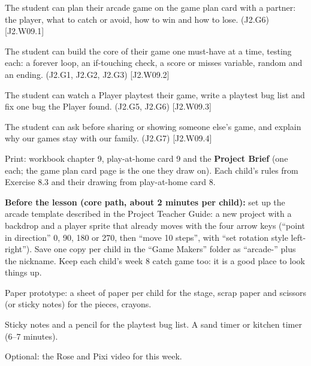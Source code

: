 
\begin{objectives}
  \item The student can plan their arcade game on the game plan card with a partner: the player, what to catch or avoid, how to win and how to lose. (J2.G6) [J2.W09.1]
  \item The student can build the core of their game one must-have at a time, testing each: a forever loop, an if-touching check, a score or misses variable, random and an ending. (J2.G1, J2.G2, J2.G3) [J2.W09.2]
  \item The student can watch a Player playtest their game, write a playtest bug list and fix one bug the Player found. (J2.G5, J2.G6) [J2.W09.3]
  \item The student can ask before sharing or showing someone else's game, and explain why our games stay with our family. (J2.G7) [J2.W09.4]
\end{objectives}

\begin{materials}
  \item Print: workbook chapter 9, play-at-home card 9 and the \textbf{Project Brief} (one each; the game plan card page is the one they draw on). Each child's rules from Exercise 8.3 and their drawing from play-at-home card 8.
  \item \textbf{Before the lesson (core path, about 2 minutes per child):} set up the arcade template described in the Project Teacher Guide: a new project with a backdrop and a player sprite that already moves with the four arrow keys (\enquote{point in direction} 0, 90, 180 or 270, then \enquote{move 10 steps}, with \enquote{set rotation style left-right}). Save one copy per child in the \enquote{Game Makers} folder as \enquote{arcade-} plus the nickname. Keep each child's week 8 catch game too: it is a good place to look things up.
  \item Paper prototype: a sheet of paper per child for the stage, scrap paper and scissors (or sticky notes) for the pieces, crayons.
  \item Sticky notes and a pencil for the playtest bug list. A sand timer or kitchen timer (6--7 minutes).
  \item Optional: the Rose and Pixi video for this week.
\end{materials}

